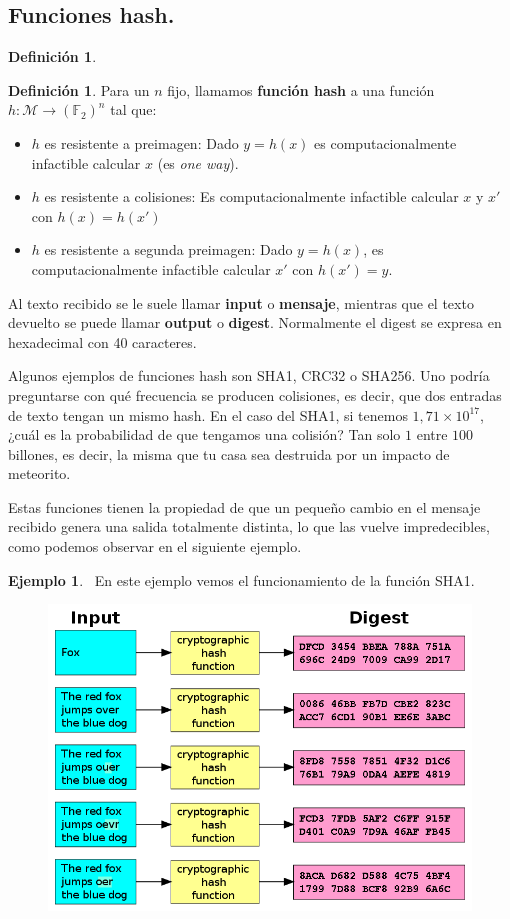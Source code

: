 \documentclass[twoside]{article}
\theoremstyle{definition}
\newtheorem{defi}[teorema]{Definición}
\newtheorem{ej}[teorema]{Ejemplo}
\begin{document}
\subsection{Funciones hash.}
\begin{defi}
\begin{defi}
Para un $n$ fijo, llamamos \textbf{función hash} a una función $h : \mathcal{M} \to (\mathbb{F}_2)^n$ tal que:
\begin{itemize}
	\item $h$ es resistente a preimagen: Dado $y=h(x)$ es computacionalmente infactible calcular $x$ (es \emph{one way}).
	\item $h$ es resistente a colisiones: Es computacionalmente infactible calcular $x$ y $x'$ con $h(x) = h(x')$
	\item $h$ es resistente a segunda preimagen: Dado $y=h(x)$, es computacionalmente infactible calcular $x'$ con $h(x')=y$.  
\end{itemize}
\end{defi}
Al texto recibido se le suele llamar \textbf{input} o \textbf{mensaje}, mientras que el texto devuelto se puede llamar \textbf{output} o \textbf{digest}. Normalmente el digest se expresa en hexadecimal con 40 caracteres. 
\end{defi}
Algunos ejemplos de funciones hash son SHA1, CRC32 o SHA256. Uno podría preguntarse con qué frecuencia se producen colisiones, es decir, que dos entradas de texto tengan un mismo hash. En el caso del SHA1, si tenemos $1,71\times 10^{17}$, ¿cuál es la probabilidad de que tengamos una colisión? Tan solo $1$ entre $100$ billones, es decir, la misma que tu casa sea destruida por un impacto de meteorito.

Estas funciones tienen la propiedad de que un pequeño cambio en el mensaje recibido genera una salida totalmente distinta, lo que las vuelve impredecibles, como podemos observar en el siguiente ejemplo.
	
\begin{ej}\
En este ejemplo vemos el funcionamiento de la función SHA1. 
\begin{figure}[h!]
\includegraphics[scale=0.4]{hashexample}
\end{figure}
\end{ej}
\end{document}
